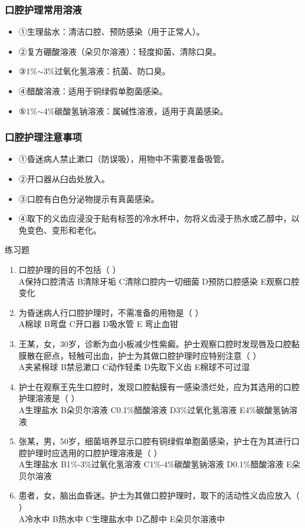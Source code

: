 \documentclass[11pt, a4paper]{ctexart}
\begin{document}
\subsubsection{口腔护理常用溶液}
\begin{itemize}
	\item ①生理盐水：清洁口腔、预防感染（用于正常人）。
	\item ②复方硼酸溶液（朵贝尔溶液）：轻度抑菌、清除口臭。
	\item ③1\%$\sim$3\%过氧化氢溶液：抗菌、防口臭。
	\item ④醋酸溶液：适用于铜绿假单胞菌感染。
	\item ⑤1\%$\sim$4\%碳酸氢钠溶液：属碱性溶液，适用于真菌感染。
\end{itemize}

\subsubsection{口腔护理注意事项}
\begin{itemize}
	\item ①昏迷病人禁止漱口（防误吸），用物中不需要准备吸管。
	\item ②开口器从臼齿处放入。
	\item ③口腔有白色分泌物提示有真菌感染。
	\item ④取下的义齿应浸没于贴有标签的冷水杯中，勿将义齿浸于热水或乙醇中，以免变色、变形和老化。
\end{itemize}

\begin{examplebox}{练习题}
	\begin{enumerate}
		\item 口腔护理的目的不包括（ ）\\
		      A保持口腔清洁 \quad B清除牙垢 \quad C清除口腔内一切细菌 \quad D预防口腔感染 \quad E观察口腔变化
		\item 为昏迷病人行口腔护理时，不需准备的用物是（ ）\\
		      A棉球 \quad B弯盘 \quad C开口器 \quad D吸水管 \quad E 弯止血钳
		\item 王某，女，30岁，诊断为血小板减少性紫癜。护士观察口腔时发现唇及口腔黏膜散在瘀点，轻触可出血，护士为其做口腔护理时应特别注意（ ）\\
		      A夹紧棉球 \quad B禁忌漱口 \quad C动作轻柔 \quad D先取下义齿 \quad E棉球不可过湿
		\item 护士在观察王先生口腔时，发现口腔黏膜有一感染溃烂处，应为其选用的口腔护理溶液是（ ）\\
		      A生理盐水 \quad B朵贝尔溶液 \quad C0.1\%醋酸溶液 \quad D3\%过氧化氢溶液 \quad E4\%碳酸氢钠溶液
		\item 张某，男，50岁，细菌培养显示口腔有铜绿假单胞菌感染，护士在为其进行口腔护理时应选用的口腔护理溶液是（ ）\\
		      A生理盐水 \quad B1\%-3\%过氧化氢溶液 \quad C1\%-4\%碳酸氢钠溶液 \quad D0.1\%醋酸溶液 \quad E朵贝尔溶液
		\item 患者，女，脑出血昏迷。护士为其做口腔护理时，取下的活动性义齿应放入（ ）\\
		      A冷水中 \quad B热水中 \quad C生理盐水中 \quad D乙醇中 \quad E朵贝尔溶液中
	\end{enumerate}
\end{examplebox}
\end{document}
